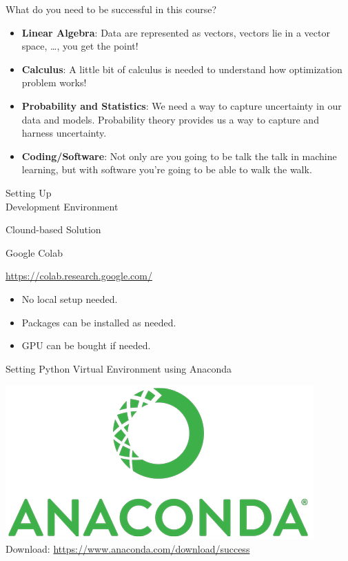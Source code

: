 \documentclass[aspectratio=169,xcolor=dvipsnames,svgnames,x11names,fleqn]{beamer}
\begin{document}
\begin{frame}{What do you need to be successful in this course?}
\begin{itemize}
    \item<2-> {\bf\color{MediumBlue}Linear Algebra}: Data are represented as vectors, vectors lie in a vector space, \ldots, you get the point!
      \item<3-> {\bf\color{MediumBlue}Calculus}: A little bit of calculus is needed to understand  how optimization problem works!
    \item<4-> {\bf\color{MediumBlue}Probability and Statistics}: We need a way to capture uncertainty in our data and models. Probability theory provides us a way to capture and harness uncertainty. 
    \item<5-> {\bf\color{MediumBlue}Coding/Software}: Not only are you going to be talk the talk in machine learning, but with software you're going to be able to walk the walk.
\end{itemize}
\end{frame}

\begin{sectionframe}{\faCoffee}{Setting Up \\Development Environment}
\end{sectionframe}

\begin{frame}{Clound-based Solution}
  \begin{center}
    Google Colab

    \url{https://colab.research.google.com/}
    \begin{itemize}
      \item No local setup needed. 
      \item Packages can be installed as needed.
      \item GPU can be bought if needed.
    \end{itemize}
  \end{center}
\end{frame}


\begin{frame}{Setting Python Virtual Environment using Anaconda}
  \begin{center}
    \includegraphics[width=0.4\linewidth]{figures/Anaconda_Logo.png}\\

    Download: \url{https://www.anaconda.com/download/success}
  \end{center}
 
\end{frame}
\end{document}
